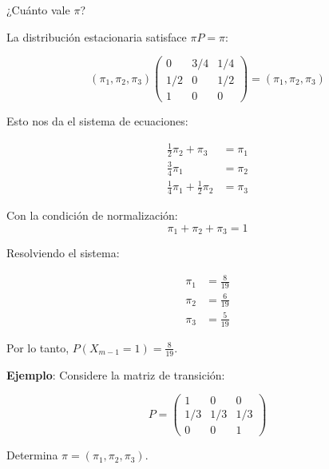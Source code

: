 \documentclass[12pt,a4paper]{article}
\begin{document}
¿Cuánto vale $\pi$?

La distribución estacionaria satisface $\pi P = \pi$:

\begin{equation*}
(\pi_1, \pi_2, \pi_3) \begin{pmatrix}
0 & 3/4 & 1/4 \\
1/2 & 0 & 1/2 \\
1 & 0 & 0
\end{pmatrix} = (\pi_1, \pi_2, \pi_3)
\end{equation*}

Esto nos da el sistema de ecuaciones:

\begin{align*}
\frac{1}{2} \pi_2 + \pi_3 &= \pi_1 \\
\frac{3}{4} \pi_1 &= \pi_2 \\
\frac{1}{4} \pi_1 + \frac{1}{2} \pi_2 &= \pi_3
\end{align*}

Con la condición de normalización:
\begin{equation}
\pi_1 + \pi_2 + \pi_3 = 1
\end{equation}

Resolviendo el sistema:

\begin{align*}
\pi_1 &= \frac{8}{19} \\
\pi_2 &= \frac{6}{19} \\
\pi_3 &= \frac{5}{19}
\end{align*}

Por lo tanto, $P(X_{m-1} = 1) = \frac{8}{19}$.

\textbf{Ejemplo}: Considere la matriz de transición:

\begin{equation*}
P = \begin{pmatrix}
1 & 0 & 0 \\
1/3 & 1/3 & 1/3 \\
0 & 0 & 1
\end{pmatrix}
\end{equation*}

Determina $\pi = (\pi_1, \pi_2, \pi_3)$.

\begin{center}
\end{center}
\end{document}
